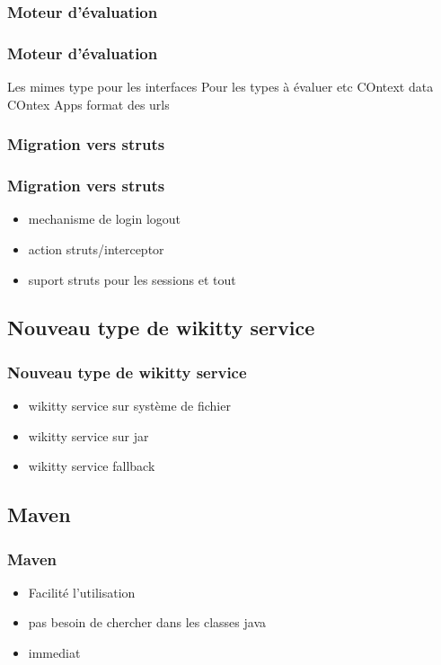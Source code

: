 \documentclass[12pt,a4paper,utf8x]{beamer}
\begin{document}
\subsubsection{Moteur d'évaluation}
\begin{frame}\frametitle{Moteur d'évaluation}
Les mimes type pour les interfaces
Pour les types à évaluer etc 
COntext data
COntex Apps
format des urls
\end{frame}

\subsubsection{Migration vers struts}
\begin{frame}\frametitle{Migration vers struts}
\begin{itemize}
\item mechanisme de login logout
\item action struts/interceptor
\item suport struts pour les sessions et tout
\end{itemize}
\end{frame}


\subsection{Nouveau type de wikitty service}
\begin{frame}\frametitle{Nouveau type de wikitty service}
\begin{itemize}
\item wikitty service sur système de fichier
\item wikitty service sur jar
\item wikitty service fallback
\end{itemize}

\end{frame}

\subsection{Maven}
\begin{frame}\frametitle{Maven}
\begin{itemize}
\item Facilité l'utilisation
\item pas besoin de chercher dans les classes java
\item immediat
\end{itemize}

\end{frame}	
\end{document}
